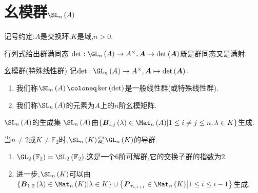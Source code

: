 \section{幺模群\texorpdfstring{$\SL_{n}\left(A\right)$}{SL(n,A)}}

记号约定:$A$是交换环,$K$是域,$n>0$.

\begin{proposition}{行列式给出群满同态}{}
	$\det:\GL_{n}\left(A\right)\to A^{\times},\boldsymbol{A}\mapsto\det\left(\boldsymbol{A}\right)$既是群同态又是满射.
\end{proposition}

\begin{definition}{幺模群(特殊线性群)}{}
	记$\det:\GL_{n}\left(A^{}\right)\to A^{\times},\boldsymbol{A}\mapsto\det\left(\boldsymbol{A}\right)$.
	\begin{enumerate}
		\item 我们称$\SL_{n}\left(A\right)\coloneq\ker\left(\det\right)$是一般线性群(或特殊线性群).
		\item 我们称$\SL_{n}\left(A\right)$的元素为$A$上的$n$阶幺模矩阵.
	\end{enumerate}
\end{definition}

\begin{proposition}{$\SL_{n}\left(A\right)$的生成集}{}
	$\SL_{n}\left(A\right)$由$\left\{\boldsymbol{B}_{i,j}\left(\lambda\right)\in\Mat_{n}\left(A\right)\middle|1\leq i\neq j\leq n,\lambda\in K\right\}$生成.
\end{proposition}

\begin{corollary}{}{}
	当$n\neq 2$或$K\neq\mathbb{F}_{2}$时,$\SL_{n}\left(K\right)$是$\GL_{n}\left(K\right)$的导群.
\end{corollary}

\begin{remark}{}{}
	\begin{enumerate}
		\item $\GL_{2}\left(\mathbb{F}_{2}\right)=\SL_{2}\left(\mathbb{F}_{2}\right)$.这是一个$6$阶可解群,它的交换子群的指数为$2$.
		\item 进一步,$\SL_{n}\left(K\right)$可以由$\left\{\boldsymbol{B}_{1,2}\left(\lambda\right)\in\Mat_{n}\left(K\right)\middle|\lambda\in K\right\}\cup\left\{\boldsymbol{P}_{\tau_{i,i+1}}\in\Mat_{n}\left(K\right)\middle|1\leq i\leq i-1\right\}$生成.
	\end{enumerate}
\end{remark}































